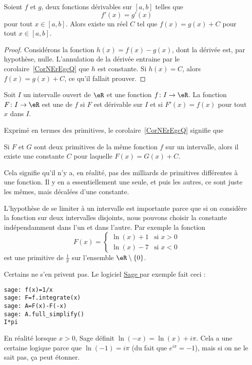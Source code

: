 \begin{corollary}   \label{CorNErEgcQ}
	Soient \( f\) et \( g\), deux fonctions dérivables sur \( [a,b]\) telles que
	\begin{equation}
		f'(x) = g'(x)
	\end{equation}
	pour tout \( x \in [a,b]\). Alors existe un réel \( C\) tel que \( f (x) = g (x) + C\) pour tout \( x\in [a,b]\).
\end{corollary}

\begin{proof}
	Considérons la fonction \( h(x)=f(x)-g(x)\), dont la dérivée est, par hypothèse, nulle. L'annulation de la dérivée entraine par le corolaire~\ref{CorNErEgcQ} que \( h\) est  constante. Si \( h(x)=C\), alors \( f(x)=g(x)+C\), ce qu'il fallait prouver.
\end{proof}

\begin{definition}  \label{DefXVMVooWhsfuI}
	Soit \( I\) un intervalle ouvert de \( \eR\) et une fonction \( f\colon I\to \eR\). La fonction \( F\colon I\to \eR\) est une  de \( f\) si \( F\) est dérivable sur \( I\) et si \( F'(x)=f(x)\) pour tout \( x\) dans \( I\).
\end{definition}

Exprimé en termes des primitives, le corolaire~\ref{CorNErEgcQ} signifie que
\begin{corollary}  \label{CorZeroCst}
	Si \( F\) et \( G\) sont deux primitives de la même fonction \( f\) sur un intervalle, alors il existe une constante \( C\) pour laquelle \( F(x)=G(x)+C\).
\end{corollary}
Cela signifie qu'il n'y a, en réalité, pas des milliards de primitives différentes à une fonction. Il y en a essentiellement une seule, et puis les autres, ce sont juste les mêmes, mais décalées d'une constante.

\begin{remark}
	L'hypothèse de se limiter à un intervalle est importante parce que si on considère la fonction sur deux intervalles disjoints, nous pouvons choisir la constante indépendamment dans l'un et dans l'autre. Par exemple la fonction
	\begin{equation}
		F(x)=\begin{cases}
			\ln(x)+1 & \text{si } x>0 \\
			\ln(x)-7 & \text{si } x<0
		\end{cases}
	\end{equation}
	est une primitive de \( \frac{1}{ x }\) sur l'ensemble \( \eR\setminus\{ 0 \}\).

	Certains ne s'en privent pas. Le logiciel \href{https://www.sagemath.org}{ Sage } par exemple fait ceci :
	\begin{verbatim}
sage: f(x)=1/x
sage: F=f.integrate(x)
sage: A=F(x)-F(-x)
sage: A.full_simplify()
I*pi
    \end{verbatim}
	En réalité lorsque \( x>0\), Sage définit \( \ln(-x)=\ln(x)+i\pi\). Cela a une certaine logique parce que \( \ln(-1)=i\pi\) (du fait que \(  e^{i\pi}=-1\)), mais si on ne le sait pas, ça peut étonner.
\end{remark}

